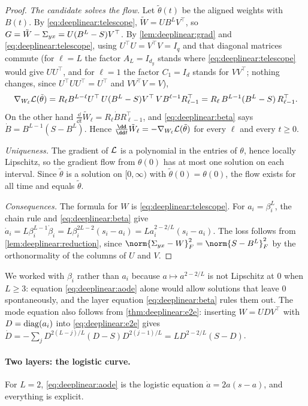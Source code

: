 \begin{refsection}
\begin{proof}
\emph{The candidate solves the flow.} Let $\tilde\theta(t)$ be the aligned weights with $B(t)$. By \eqref{eq:deeplinear:telescope}, $\tilde W=UB^LV^\top$, so $G=\tilde W-\Sigma_{yx}=U(B^L-S)V^\top$. By \cref{lem:deeplinear:grad} and \eqref{eq:deeplinear:telescope}, using $U^\top U=V^\top V=I_q$ and that diagonal matrices commute (for $\ell=L$ the factor $A_L=I_{d_y}$ stands where \eqref{eq:deeplinear:telescope} would give $UU^\top$, and for $\ell=1$ the factor $C_1=I_d$ stands for $VV^\top$; nothing changes, since $U^\top UU^\top=U^\top$ and $VV^\top V=V$),
\[
  \nabla_{W_\ell}\mathcal{L}(\tilde\theta)=R_\ell B^{L-\ell}U^\top\,U(B^L-S)V^\top\,VB^{\ell-1}R_{\ell-1}^\top=R_\ell\,B^{L-1}(B^L-S)\,R_{\ell-1}^\top .
\]
On the other hand $\frac{\dd}{\dd t}\tilde W_\ell=R_\ell\dot B R_{\ell-1}^\top$, and \eqref{eq:deeplinear:beta} says $\dot B=B^{L-1}(S-B^L)$. Hence $\frac{\dd}{\dd t}\tilde W_\ell=-\nabla_{W_\ell}\Loss(\tilde\theta)$ for every $\ell$ and every $t\ge0$.

\emph{Uniqueness.} The gradient of $\mathcal{L}$ is a polynomial in the entries of $\theta$, hence locally Lipschitz, so the gradient flow from $\theta(0)$ has at most one solution on each interval. Since $\tilde\theta$ is a solution on $[0,\infty)$ with $\tilde\theta(0)=\theta(0)$, the flow exists for all time and equals $\tilde\theta$.

\emph{Consequences.} The formula for $W$ is \eqref{eq:deeplinear:telescope}. For $a_i=\beta_i^L$, the chain rule and \eqref{eq:deeplinear:beta} give $\dot a_i=L\beta_i^{L-1}\dot\beta_i=L\beta_i^{2L-2}(s_i-a_i)=La_i^{2-2/L}(s_i-a_i)$. The loss follows from \cref{lem:deeplinear:reduction}, since $\norm{\dlS-W}_F^2=\norm{S-B^L}_F^2$ by the orthonormality of the columns of $U$ and $V$.
\end{proof}

We worked with $\beta_i$ rather than $a_i$ because $a\mapsto a^{2-2/L}$ is not Lipschitz at $0$ when $L\ge3$: equation \eqref{eq:deeplinear:aode} alone would allow solutions that leave $0$ spontaneously, and the layer equation \eqref{eq:deeplinear:beta} rules them out. The mode equation also follows from \cref{thm:deeplinear:e2e}: inserting $W=UD V^\top$ with $D=\operatorname{diag}(a_i)$ into \eqref{eq:deeplinear:e2e} gives $\dot D=-\sum_jD^{2(L-j)/L}(D-S)D^{2(j-1)/L}=LD^{2-2/L}(S-D)$.

\paragraph{Two layers: the logistic curve.} For $L=2$, \eqref{eq:deeplinear:aode} is the logistic equation $\dot a=2a(s-a)$, and everything is explicit.


\end{refsection}

